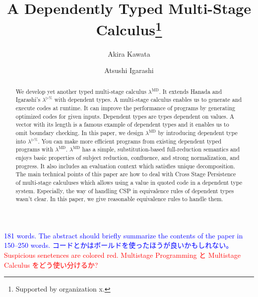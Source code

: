 \documentclass[runningheads]{llncs}
\newcommand{\red}[1]{\textcolor{red}{#1 }}
\newcommand{\blue}[1]{\textcolor{blue}{#1 }}
\newcommand{\LTP}{$\lambda^{\triangleright\%}$\xspace}
\newcommand{\LMD}{$\lambda^{\textrm{MD}}$\xspace}
\newcommand{\TW}{\triangleright}
\begin{document}
%
\title{A Dependently Typed Multi-Stage Calculus\thanks{Supported by organization x.}}
%
%
\author{Akira Kawata \and
    Atsushi Igarashi}
%
%
%
\maketitle              %
%
\begin{abstract}

    We develop yet another typed multi-stage calculus \LMD.
    It extends Hanada and Igarashi's \LTP with dependent types.
    A multi-stage calculus enables us to generate and execute codes at runtime.
    It can improve the performance of programs by generating optimized codes for given inputs.
    Dependent types are types dependent on values. 
    A vector with its length is a famous example of dependent types and it enables us to omit boundary checking.
    In this paper, we design \LMD by introducing dependent type into $\lambda^{\TW\%}$.
    You can make more efficient programs from existing dependent typed programs with \LMD.
    \LMD has a simple, substitution-based full-reduction semantics and enjoys basic properties of subject reduction, confluence, and strong normalization, and progress.
    It also includes an evaluation context which satisfies unique decomposition.
    The main technical points of this paper are how to deal with Cross Stage Persistence of multi-stage calculuses which allows using a value in quoted code in a dependent type system.
    Especially, the way of handling CSP in equivalence rules of dependent types wasn't clear.
    In this paper, we give reasonable equivalence rules to handle them.
    
\end{abstract}

\blue{181 words. The abstract should briefly summarize the contents of the paper in 150--250 words.}
\blue{コードとかはボールドを使ったほうが良いかもしれない。}
\red{Suspicious senetences are colored red.}
%
%
%
\red{Multistage Programming と Multistage Calculus をどう使い分けるか?}
\end{document}
